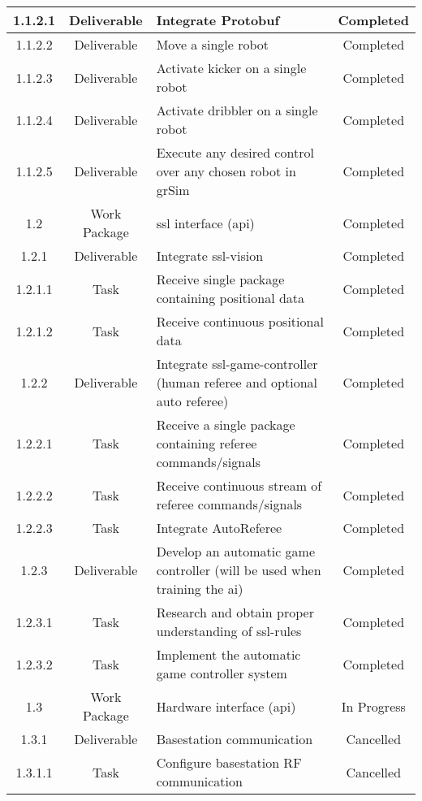 \begin{longtable}{|c|c|m{}|c|}
    \rowcolor{d} 1.1.2.1 & Deliverable & Integrate Protobuf & Completed \\ \hline
    \rowcolor{d} 1.1.2.2 & Deliverable & Move a single robot & Completed \\ \hline
    \rowcolor{d} 1.1.2.3 & Deliverable & Activate kicker on a single robot & Completed \\ \hline
    \rowcolor{d} 1.1.2.4 & Deliverable & Activate dribbler on a single robot & Completed \\ \hline
    \rowcolor{d} 1.1.2.5 & Deliverable & Execute any desired control over any chosen robot in grSim & Completed \\ \hline
    \rowcolor{d} 1.2 & Work Package & \acs{ssl} interface (\acs{api}) & Completed \\ \hline
    \rowcolor{d} 1.2.1 & Deliverable & Integrate ssl-vision & Completed \\ \hline
    \rowcolor{d} 1.2.1.1 & Task & Receive single package containing positional data & Completed \\ \hline
    \rowcolor{d} 1.2.1.2 & Task & Receive continuous positional data & Completed \\ \hline
    \rowcolor{d} 1.2.2 & Deliverable & Integrate ssl-game-controller (human referee and optional auto referee) & Completed \\ \hline
    \rowcolor{d} 1.2.2.1 & Task & Receive a single package containing referee commands/signals & Completed \\ \hline
    \rowcolor{d} 1.2.2.2 & Task & Receive continuous stream of referee commands/signals & Completed \\ \hline
    \rowcolor{d} 1.2.2.3 & Task & Integrate AutoReferee & Completed \\ \hline
    \rowcolor{d} 1.2.3 & Deliverable & Develop an automatic game controller (will be used when training the \acs{ai}) & Completed \\ \hline
    \rowcolor{d} 1.2.3.1 & Task & Research and obtain proper understanding of \acs{ssl}-rules & Completed \\ \hline
    \rowcolor{d} 1.2.3.2 & Task & Implement the automatic game controller system & Completed \\ \hline
    \rowcolor{p} 1.3 & Work Package & Hardware interface (\acs{api}) & In Progress \\ \hline
    \rowcolor{c} 1.3.1 & Deliverable & Basestation communication & Cancelled \\ \hline
    \rowcolor{c} 1.3.1.1 & Task & Configure basestation RF communication & Cancelled \\ \hline

\end{longtable}
